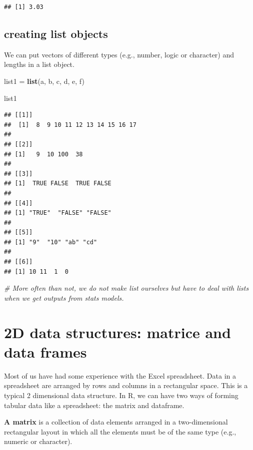 \documentclass[]{book}
\newenvironment{Shaded}{\begin{snugshade}}{\end{snugshade}}
\newcommand{\KeywordTok}[1]{\textcolor[rgb]{0.13,0.29,0.53}{\textbf{#1}}}
\newcommand{\StringTok}[1]{\textcolor[rgb]{0.31,0.60,0.02}{#1}}
\newcommand{\CommentTok}[1]{\textcolor[rgb]{0.56,0.35,0.01}{\textit{#1}}}
\newcommand{\NormalTok}[1]{#1}
\begin{document}
\begin{verbatim}
## [1] 3.03
\end{verbatim}

\subsection{creating list objects}\label{creating-list-objects}

We can put vectors of different types (e.g., number, logic or character)
and lengths in a list object.

\begin{Shaded}
\begin{Highlighting}[]
\NormalTok{list1 =}\StringTok{ }\KeywordTok{list}\NormalTok{(a, b, c, d, e, f)}

\NormalTok{list1}
\end{Highlighting}
\end{Shaded}

\begin{verbatim}
## [[1]]
##  [1]  8  9 10 11 12 13 14 15 16 17
## 
## [[2]]
## [1]   9  10 100  38
## 
## [[3]]
## [1]  TRUE FALSE  TRUE FALSE
## 
## [[4]]
## [1] "TRUE"  "FALSE" "FALSE"
## 
## [[5]]
## [1] "9"  "10" "ab" "cd"
## 
## [[6]]
## [1] 10 11  1  0
\end{verbatim}

\begin{Shaded}
\begin{Highlighting}[]
\CommentTok{# More often than not, we do not make list ourselves but have to deal with lists when we get outputs from stats models.}
\end{Highlighting}
\end{Shaded}

\section{2D data structures: matrice and data
frames}\label{d-data-structures-matrice-and-data-frames}

Most of us have had some experience with the Excel spreadsheet. Data in
a spreadsheet are arranged by rows and columns in a rectangular space.
This is a typical 2 dimensional data structure. In R, we can have two
ways of forming tabular data like a spreadsheet: the matrix and
dataframe.

\textbf{A matrix }is a collection of data elements arranged in a
two-dimensional rectangular layout in which all the elements must be of
the same type (e.g., numeric or character).
\end{document}
